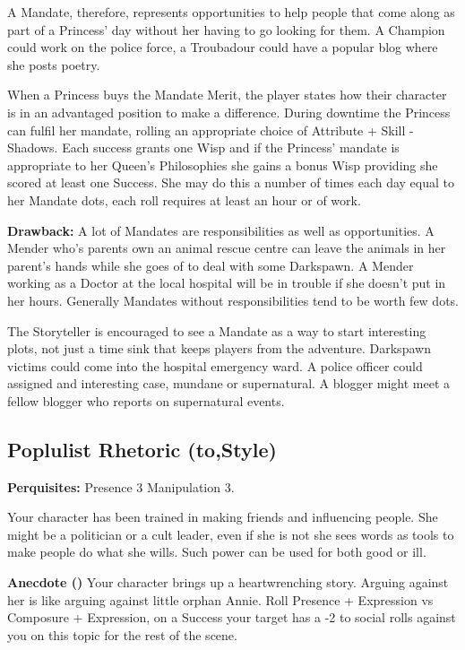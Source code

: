 A Mandate, therefore, represents opportunities to help people that come along as part of a Princess' day without her having to go looking for them. A Champion could work on the police force, a Troubadour could have a popular blog where she posts poetry. 

When a Princess buys the Mandate Merit, the player states how their character is in an advantaged position to make a difference. During downtime the Princess can fulfil her mandate, rolling an appropriate choice of Attribute + Skill - Shadows. Each success grants one Wisp and if the Princess' mandate is appropriate to her Queen's Philosophies she gains a bonus Wisp providing she scored at least one Success. She may do this a number of times each day equal to her Mandate dots, each roll requires at least an hour or of work. 

\textbf{Drawback:} A lot of Mandates are responsibilities as well as opportunities. A Mender who's parents own an animal rescue centre can leave the animals in her parent's hands while she goes of to deal with some Darkspawn. A Mender working as a Doctor at the local hospital will be in trouble if she doesn’t put in her hours. Generally Mandates without responsibilities tend to be worth few dots. 

The Storyteller is encouraged to see a Mandate as a way to start interesting plots, not just a time sink that keeps players from the adventure. Darkspawn victims could come into the hospital emergency ward. A police officer could assigned and interesting case, mundane or supernatural. A blogger might meet a fellow blogger who reports on supernatural events. 

\subsection*{Poplulist Rhetoric (\textbullet\nobreak\hspace{.16667em}to\nobreak\hspace{.16667em}\textbullet\textbullet\textbullet\textbullet\textbullet,\nobreak\hspace{.16667em}Style)}

\textbf{Perquisites:} Presence 3 Manipulation 3.

Your character has been trained in making friends and influencing people. She might be a politician or a cult leader, even if she is not she sees words as tools to make people do what she wills. Such power can be used for both good or ill.

\textbf{Anecdote (\textbullet)} Your character brings up a heartwrenching story. Arguing against her is like arguing against little orphan Annie. Roll Presence + Expression vs Composure + Expression, on a Success your target has a -2 to social rolls against you on this topic for the rest of the scene.

